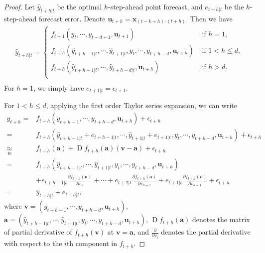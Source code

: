 \documentclass[
  11pt,
  a4paper,
]{article}
\theoremstyle{plain}
\theoremstyle{remark}
\begin{document}
\begin{proof}
Let \(\hat{y}_{t+h|t}\) be the optimal \(h\)-step-ahead point forecast,
and \(e_{t+h|t}\) be the \(h\)-step-ahead forecast error. Denote
\(\bm{u}_{t+h}=\bm{x}_{(t-k+h):(t+h)}\). Then we have \[
\begin{aligned}
\hat{y}_{t+h|t}=\begin{cases}
      f_{t+1}\left(y_t,\cdots,y_{t-d+1},\bm{u}_{t+1}\right) & \text{ if } h=1, \\
      f_{t+h}\left(\hat{y}_{t+h-1|t},\cdots,\hat{y}_{t+1|t},y_t,\cdots,y_{t+h-d},\bm{u}_{t+h}\right) &  \text{ if } 1 < h \leq d, \\
      f_{t+h}\left(\hat{y}_{t+h-1|t},\cdots,\hat{y}_{t+h-d|t},\bm{u}_{t+h}\right) & \text{ if } h > d.\\
    \end{cases}\\
\end{aligned}
\] For \(h=1\), we simply have \(e_{t+1|t} = \epsilon_{t+1}\).

For \(1<h\leq d\), applying the first order Taylor series expansion, we
can write \[
\begin{aligned}
y_{t+h}
=&f_{t+h}\left(y_{t+h-1},\cdots,y_{t+h-d},\bm{u}_{t+h}\right)+\epsilon_{t+h} \\
=&f_{t+h}\left(\hat{y}_{t+h-1|t}+e_{t+h-1|t},\cdots,\hat{y}_{t+1|t}+e_{t+1|t},y_{t},\cdots,y_{t+h-d},\bm{u}_{t+h}\right)+\epsilon_{t+h} \\
\underset{\text{te}}{\approx}&f_{t+h}\left(\bm{a}\right)+\operatorname{D}f_{t+h}\left(\bm{a}\right)\left(\bm{v}-\bm{a}\right)+
\epsilon_{t+h} \\
=&f_{t+h}\left(\hat{y}_{t+h-1|t},\cdots,\hat{y}_{t+1|t},y_{t},\cdots,y_{t+h-d},\bm{u}_{t+h}\right) \\
&+e_{t+h-1|t}\frac{\partial f_{t+h}\left(\bm{a}\right)}{\partial v_1}+\cdots+e_{t+2|t}\frac{\partial f_{t+h}\left(\bm{a}\right)}{\partial v_{h-2}}+e_{t+1|t}\frac{\partial f_{t+h}\left(\bm{a}\right)}{\partial v_{h-1}}+\epsilon_{t+h} \\
=&\hat{y}_{t+h|t}+e_{t+h|t},
\end{aligned}
\] where
\(\bm{v}=\left(y_{t+h-1},\cdots,y_{t+h-d},\bm{u}_{t+h}\right)\),
\(\bm{a} =\left(\hat{y}_{t+h-1|t},\cdots,\hat{y}_{t+1|t},y_{t},\cdots,y_{t+h-d},\bm{u}_{t+h}\right)\),
\(\operatorname{D}f_{t+h}\left(\bm{a}\right)\) denotes the matrix of
partial derivative of \(f_{t+h}(\bm{v})\) at \(\bm{v}=\bm{a}\), and
\(\frac{\partial}{\partial v_i}\) denotes the partial derivative with
respect to the \(i\)th component in \(f_{t+h}\).


\end{proof}
\end{document}
